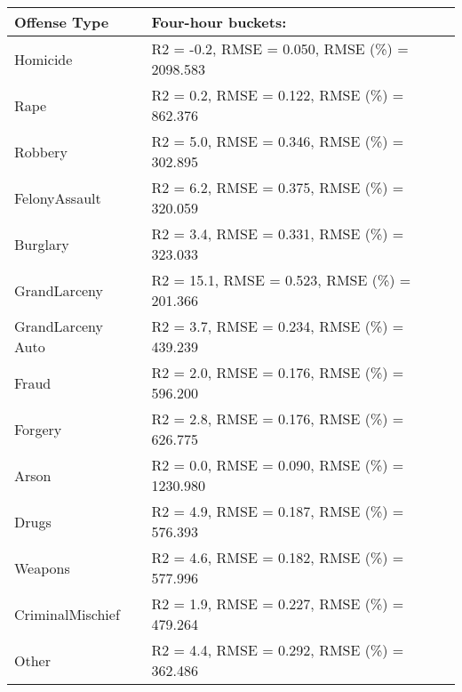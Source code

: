 \documentclass[10pt,journal,compsoc]{IEEEtran}
\begin{document}
\begin{tabular}{ |p{3cm}|p{4cm}|  }
 \hline
 Offense Type& Four-hour buckets:\\
 \hline
 Homicide& R2 = -0.2, RMSE = 0.050, RMSE (\%) = 2098.583\\
 \hline
 Rape & R2 = 0.2, RMSE = 0.122, RMSE (\%) = 862.376\\
  \hline
Robbery & R2 = 5.0, RMSE = 0.346, RMSE (\%) = 302.895\\
 \hline
FelonyAssault& R2 = 6.2, RMSE = 0.375, RMSE (\%) = 320.059\\
 \hline
Burglary& R2 = 3.4, RMSE = 0.331, RMSE (\%) = 323.033\\
 \hline
GrandLarceny & R2 = 15.1, RMSE = 0.523, RMSE (\%) = 201.366\\
 \hline
GrandLarceny Auto & R2 = 3.7, RMSE = 0.234, RMSE (\%) = 439.239\\
 \hline
Fraud &R2 = 2.0, RMSE = 0.176, RMSE (\%) = 596.200\\
 \hline
Forgery& R2 = 2.8, RMSE = 0.176, RMSE (\%) = 626.775\\
 \hline
Arson& R2 = 0.0, RMSE = 0.090, RMSE (\%) = 1230.980\\
 \hline
Drugs &R2 = 4.9, RMSE = 0.187, RMSE (\%) = 576.393 \\
\hline
Weapons &R2 = 4.6, RMSE = 0.182, RMSE (\%) = 577.996\\
 \hline
CriminalMischief& R2 = 1.9, RMSE = 0.227, RMSE (\%) = 479.264\\
 \hline
Other& R2 = 4.4, RMSE = 0.292, RMSE (\%) = 362.486\\
 \hline
\end{tabular}
\end{document}
